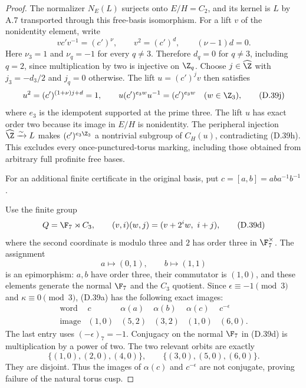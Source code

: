 \begin{proof}
The normalizer $N_E(L)$ surjects onto
$E/H=C_2$, and its kernel is $L$ by A.7
transported through this free-basis isomorphism.
For a lift $v$ of the nonidentity element,
write
\[
  vc'v^{-1}=(c')^\nu,\qquad
  v^2=(c')^d,
  \qquad(\nu-1)d=0.                                    \tag{D.39i}
\]
Here $\nu_3=1$ and $\nu_q=-1$ for every
$q\ne3$.  Therefore $d_q=0$ for $q\ne3$,
including $q=2$, since multiplication by two
is injective on $\Z_q$.
Choose $j\in\widehat\Z$ with
$j_3=-d_3/2$ and $j_q=0$ otherwise.
The lift $u=(c')^jv$ then satisfies
\[
 u^2=(c')^{(1+\nu)j+d}=1,
 \qquad
 u(c')^{e_3w}u^{-1}=(c')^{e_3w}
                       \quad(w\in\Z_3),                 \tag{D.39j}
\]
where $e_3$ is the idempotent supported at
the prime three.
The lift $u$ has exact order two because
its image in $E/H$ is nonidentity.
The peripheral injection
$\widehat\Z\xrightarrow{\sim}L$ makes
$(c')^{e_3\Z_3}$ a nontrivial subgroup of
$C_H(u)$, contradicting (D.39h).
This excludes every once-punctured-torus
marking, including those obtained from
arbitrary full profinite free bases.

For an additional finite certificate in
the original basis, put
$c=[a,b]=aba^{-1}b^{-1}$.

Use the finite group
\[
 Q=\F_7\rtimes C_3,\qquad
 (v,i)(w,j)=(v+2^i w,\ i+j),
                                                               \tag{D.39d}
\]
where the second coordinate is modulo
three and $2$ has order three in
$\F_7^\times$.
The assignment
\[
                    a\mapsto(0,1),\qquad b\mapsto(1,1)
                                                               \tag{D.39e}
\]
is an epimorphism: $a,b$ have order
three, their commutator is $(1,0)$,
and these elements generate the
normal $\F_7$ and the $C_3$ quotient.
Since $\epsilon\equiv-1\pmod3$
and $\kappa\equiv0\pmod3$, (D.39a)
has the following exact images:
\[
 \begin{array}{c|ccccc}
 \text{word}&c&\alpha(a)&\alpha(b)&\alpha(c)&c^{-\epsilon}\\ \hline
 \text{image}&(1,0)&(5,2)&(3,2)&(1,0)&(6,0).
 \end{array}                                                   \tag{D.39f}
\]
The last entry uses
$(-\epsilon)_7=-1$.
Conjugacy on the normal $\F_7$ in
(D.39d) is multiplication by a
power of two.  The two relevant
orbits are exactly
\[
             \{(1,0),(2,0),(4,0)\},\qquad
             \{(3,0),(5,0),(6,0)\}.
\]
They are disjoint.  Thus the images
of $\alpha(c)$ and $c^{-\epsilon}$
are not conjugate, proving failure
of the natural torus cusp.


\end{proof}
